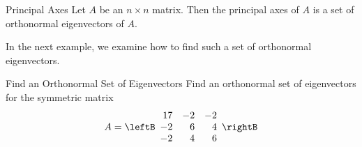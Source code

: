 \begin{definition}{Principal Axes}\label{def:principalaxes}
Let $A$ be an $n \times n$ matrix. Then the principal axes of $A$ is a set of orthonormal eigenvectors of $A$.
\end{definition}

In the next example, we examine how to find such a set of orthonormal eigenvectors.

\begin{example}{Find an Orthonormal Set of Eigenvectors}\label{exa:orthbasiseigenvectors}
Find an orthonormal set of eigenvectors for the symmetric matrix
\begin{equation*}
A = \leftB
\begin{array}{rrr}
17 & -2 & -2 \\
-2 & 6 & 4 \\
-2 & 4 & 6
\end{array}
\rightB
\end{equation*}
\end{example}

